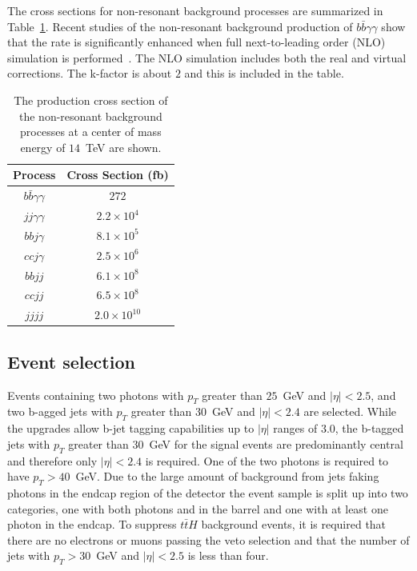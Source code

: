 The cross sections for non-resonant background processes are summarized in Table~\ref{tab:CrossSections}. Recent studies of the non-resonant background production of $b \bar{b} \gamma\gamma$ show that the rate is significantly enhanced when full next-to-leading order (NLO) simulation is performed~\cite{Azatov:2015oxa}. The NLO simulation includes both the real and virtual corrections. The k-factor is about $2$ and this is included in the table.  


\begin{table}[!ht]
\begin{center} 
\begin{tabular}{|c|c|}
\hline
Process                                           &   Cross Section (fb)   \\ \hline
$b \bar{b} \gamma\gamma$                          &   $272$                            \\
$jj \gamma\gamma$                                 &   $2.2 \times 10^{4}$              \\
$bb j\gamma$                                      &   $8.1 \times 10^{5}$              \\
$cc j\gamma$                                      &   $2.5 \times 10^{6}$              \\
$bb jj$                                           &   $6.1 \times 10^{8}$              \\
$cc jj$                                           &   $6.5 \times 10^{8}$              \\
$jjjj$                                            &   $2.0 \times 10^{10}$             \\ \hline
\end{tabular}
\caption{ The production cross section of the non-resonant background processes at a center of mass energy 
of $14$~TeV are shown.}
\label{tab:CrossSections}
\end{center}
\end{table}

\subsection{Event selection}
\label{sec:eventselection}
 
Events containing two photons with $p_{T}$ greater than $25$~GeV
and $|\eta|<2.5$, and two b-agged jets with $p_{T}$ greater than $30$~GeV and $|\eta|<2.4$ are selected. While the \phasetwo upgrades allow b-jet tagging capabilities up to $|\eta|$ ranges of $3.0$, the b-tagged jets with $p_{T}$ greater than $30$~GeV for the signal events are predominantly central and therefore only $|\eta|<2.4$ is required. One of the two photons is required to have $p_{T} > 40$~GeV. Due to the large amount of background from jets faking photons in the endcap region of the detector the event sample is split up into two categories, one with both photons and in the barrel and one
with at least one photon in the endcap. To suppress $t\bar{t}H$ background
events, it is required that there are no electrons or muons passing the veto selection and that 
the number of jets with $p_{T}>30$~GeV and $|\eta|<2.5$ is less than four. 

